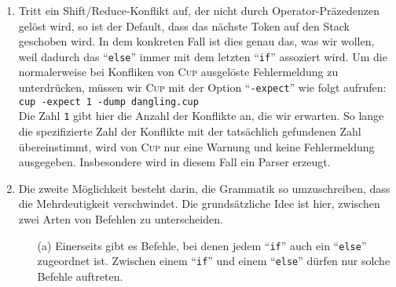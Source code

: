 \begin{enumerate}
\item Tritt ein Shift/Reduce-Konflikt auf, der nicht durch Operator-Pr\"azedenzen gel\"ost wird,
      so ist der Default, dass das n\"achste Token auf den Stack geschoben wird.  In dem konkreten
      Fall ist dies genau das, was wir wollen, weil dadurch das ``\texttt{else}'' immer mit dem letzten
      ``\texttt{if}'' assoziert wird.  Um die normalerweise bei Konfliken von \textsc{Cup}
      ausgel\"oste Fehlermeldung zu unterdr\"ucken, m\"ussen wir \textsc{Cup} mit der Option
      ``\texttt{-expect}'' wie folgt aufrufen:
      \\[0.2cm]
      \hspace*{1.3cm}
      \texttt{cup -expect 1 -dump dangling.cup}
      \\[0.2cm]
      Die Zahl \texttt{1} gibt hier die Anzahl der Konflikte an, die wir erwarten.
      So lange die spezifizierte Zahl der Konflikte mit der tats\"achlich gefundenen Zahl \"ubereinstimmt,
      wird von \textsc{Cup} nur eine Warnung und keine Fehlermeldung ausgegeben. Insbesondere wird
      in diesem Fall ein Parser erzeugt.
\item Die zweite M\"oglichkeit besteht darin, die Grammatik so umzuschreiben, dass die Mehrdeutigkeit
      verschwindet.   Die grunds\"atzliche Idee ist hier, zwischen zwei Arten von Befehlen zu
      unterscheiden.
      \begin{enumerate}
      \item[(a)] Einerseits gibt es Befehle, bei denen jedem ``\texttt{if}'' auch ein ``\texttt{else}''
            zugeordnet ist.  Zwischen einem ``\texttt{if}'' und einem ``\texttt{else}'' d\"urfen nur
            solche Befehle auftreten.


\end{enumerate}
\end{enumerate}
